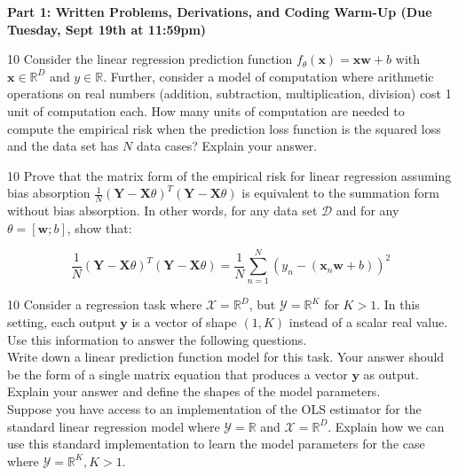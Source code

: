 \documentclass[11pt]{article}
\newcommand{\mbf}[1]{{\mathbf{#1}}}
\begin{document}
\textbf{Part 1: Written Problems, Derivations, and Coding Warm-Up (Due Tuesday, Sept 19th at 11:59pm)}

\begin{problem}{10} Consider the linear regression prediction function $f_{\theta}(\mbf{x}) = \mbf{x}\mbf{w}+b$ with $\mbf{x}\in\mathbb{R}^D$ and $y\in\mathbb{R}$. 
Further, consider a model of computation where arithmetic operations on real numbers (addition, subtraction, multiplication, division) cost 1 unit of computation each. How many units of computation are needed to compute the empirical risk when the prediction loss function is the squared loss and the data set has $N$ data cases? Explain your answer. 
\end{problem}

\clearpage
\begin{problem}{10} Prove that the  matrix form of the empirical risk for linear regression assuming bias absorption $\frac{1}{N}(\mbf{Y}-\mbf{X}\theta)^T(\mbf{Y}-\mbf{X}\theta)$ is equivalent to the summation form without bias absorption. In other words, for any data set $\mathcal{D}$ and for any $\theta=[\mbf{w};b]$, show that:

$$\frac{1}{N}(\mbf{Y}-\mbf{X}\theta)^T(\mbf{Y}-\mbf{X}\theta)=\frac{1}{N}\sum_{n=1}^N(y_n-(\mbf{x}_n\mbf{w}+b))^2$$
\end{problem}

\begin{problem}{10} Consider a regression task where $\mathcal{X}=\mathbb{R}^D$, but $\mathcal{Y}=\mathbb{R}^K$ for $K>1$. In this setting, each output $\mbf{y}$ is a vector of shape $(1,K)$ instead of a scalar real value. Use this information to answer the following questions.\\

 Write down a linear prediction function model for this task. Your answer should be the form of a single matrix equation that produces a vector $\mbf{y}$ as output. Explain your answer and define the shapes of the model parameters.\\

 Suppose you have access to an implementation of the OLS estimator for the standard linear regression model where $\mathcal{Y}=\mathbb{R}$ and $\mathcal{X}=\mathbb{R}^D$. Explain how we can use this standard implementation to learn the model parameters for the case where $\mathcal{Y}=\mathbb{R}^K, K>1$.

\end{problem}
\end{document}
